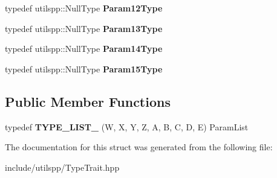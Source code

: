\begin{DoxyCompactItemize}
\item 
\hypertarget{structutilspp_1_1PointerOnFunction_3_01V_07_5_08_07W_00_01X_00_01Y_00_01Z_00_01A_00_01B_00_01C_00_01D_00_01E_08_4_a1d725cea86770a80a0823db606f6f0e3}{typedef utilspp\-::\-Null\-Type {\bfseries Param12\-Type}}\label{structutilspp_1_1PointerOnFunction_3_01V_07_5_08_07W_00_01X_00_01Y_00_01Z_00_01A_00_01B_00_01C_00_01D_00_01E_08_4_a1d725cea86770a80a0823db606f6f0e3}

\item 
\hypertarget{structutilspp_1_1PointerOnFunction_3_01V_07_5_08_07W_00_01X_00_01Y_00_01Z_00_01A_00_01B_00_01C_00_01D_00_01E_08_4_a2a479e1f80396f536f194e9888be28f9}{typedef utilspp\-::\-Null\-Type {\bfseries Param13\-Type}}\label{structutilspp_1_1PointerOnFunction_3_01V_07_5_08_07W_00_01X_00_01Y_00_01Z_00_01A_00_01B_00_01C_00_01D_00_01E_08_4_a2a479e1f80396f536f194e9888be28f9}

\item 
\hypertarget{structutilspp_1_1PointerOnFunction_3_01V_07_5_08_07W_00_01X_00_01Y_00_01Z_00_01A_00_01B_00_01C_00_01D_00_01E_08_4_a36c028c5fb83015e785c4ca3beabeaa8}{typedef utilspp\-::\-Null\-Type {\bfseries Param14\-Type}}\label{structutilspp_1_1PointerOnFunction_3_01V_07_5_08_07W_00_01X_00_01Y_00_01Z_00_01A_00_01B_00_01C_00_01D_00_01E_08_4_a36c028c5fb83015e785c4ca3beabeaa8}

\item 
\hypertarget{structutilspp_1_1PointerOnFunction_3_01V_07_5_08_07W_00_01X_00_01Y_00_01Z_00_01A_00_01B_00_01C_00_01D_00_01E_08_4_ab7ffd3a1c4c9a185336701954809c08b}{typedef utilspp\-::\-Null\-Type {\bfseries Param15\-Type}}\label{structutilspp_1_1PointerOnFunction_3_01V_07_5_08_07W_00_01X_00_01Y_00_01Z_00_01A_00_01B_00_01C_00_01D_00_01E_08_4_ab7ffd3a1c4c9a185336701954809c08b}

\end{DoxyCompactItemize}
\subsection*{Public Member Functions}
\begin{DoxyCompactItemize}
\item 
\hypertarget{structutilspp_1_1PointerOnFunction_3_01V_07_5_08_07W_00_01X_00_01Y_00_01Z_00_01A_00_01B_00_01C_00_01D_00_01E_08_4_a1895a61c764996abd460752b0f9a85d0}{typedef {\bfseries T\-Y\-P\-E\-\_\-\-L\-I\-S\-T\-\_} (W, X, Y, Z, A, B, C, D, E) Param\-List}\label{structutilspp_1_1PointerOnFunction_3_01V_07_5_08_07W_00_01X_00_01Y_00_01Z_00_01A_00_01B_00_01C_00_01D_00_01E_08_4_a1895a61c764996abd460752b0f9a85d0}

\end{DoxyCompactItemize}


The documentation for this struct was generated from the following file\-:\begin{DoxyCompactItemize}
\item 
include/utilspp/Type\-Trait.\-hpp\end{DoxyCompactItemize}
